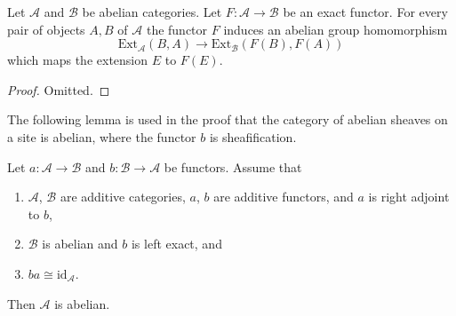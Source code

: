 \begin{lemma}
\label{lemma-exact-functor-ext}
Let $\mathcal{A}$ and $\mathcal{B}$ be abelian categories.
Let $F : \mathcal{A} \to \mathcal{B}$ be an exact functor.
For every pair of objects $A, B$ of $\mathcal{A}$ the
functor $F$ induces an abelian group homomorphism
$$
\text{Ext}_\mathcal{A}(B, A)
\longrightarrow
\text{Ext}_\mathcal{B}(F(B), F(A))
$$
which maps the extension $E$ to $F(E)$.
\end{lemma}

\begin{proof}
Omitted.
\end{proof}

\noindent
The following lemma is used in the proof that the category of abelian
sheaves on a site is abelian, where the functor $b$ is sheafification.

\begin{lemma}
\label{lemma-adjoint-get-abelian}
Let $a : \mathcal{A} \to \mathcal{B}$ and $b : \mathcal{B} \to \mathcal{A}$
be functors. Assume that
\begin{enumerate}
\item $\mathcal{A}$, $\mathcal{B}$ are additive categories,
$a$, $b$ are additive functors, and $a$ is right adjoint to $b$,
\item $\mathcal{B}$ is abelian and $b$ is left exact, and
\item $ba \cong \text{id}_\mathcal{A}$.
\end{enumerate}
Then $\mathcal{A}$ is abelian.
\end{lemma}

